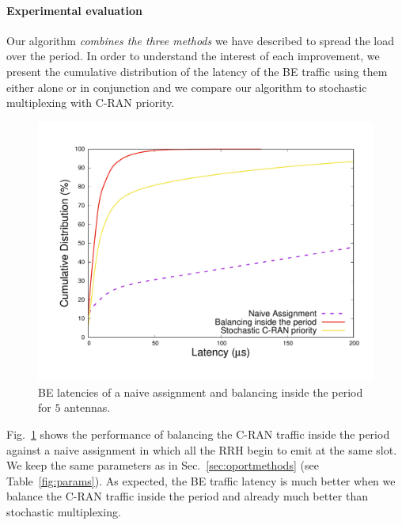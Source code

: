 \documentclass[10pt, conference, letterpaper]{IEEEtran}
\begin{document}
  \paragraph{Experimental evaluation}

  Our algorithm \emph{combines the three methods} we have described to spread the load over the period.
  In order to understand the interest of each improvement, we present the cumulative distribution of the latency of the BE traffic using them either alone or in conjunction and we compare our algorithm to stochastic multiplexing with C-RAN priority.
   
       \vspace{-0.4cm}
\begin{figure}[h!]
\begin{center}   

      \includegraphics[scale=0.25]{periodonly}
     \caption{BE latencies of a naive assignment and balancing inside the period for $5$ antennas.}  
     \label{fig:periodonly}
  \end{center}
  \end{figure}
    \vspace{-0.4cm}
    
Fig.~\ref{fig:periodonly} shows the performance of balancing the C-RAN traffic inside the period against a naive assignment in which all the RRH begin to emit at the same slot. We keep the same parameters as in Sec.~\ref{sec:oportmethods} (see Table~\ref{fig:params}). As expected, the BE traffic latency is much better when we balance the C-RAN traffic inside the period and already much better than stochastic multiplexing.
\end{document}
